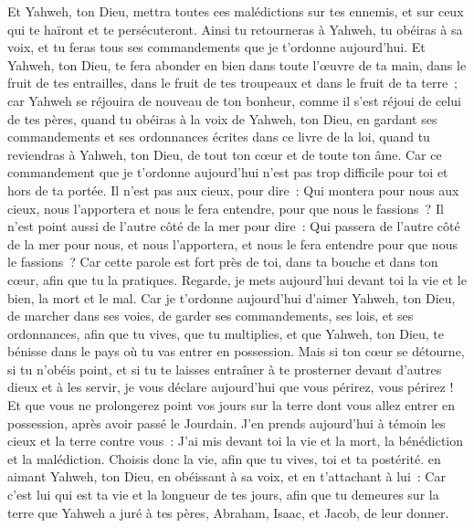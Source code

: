 \begin{multicols}{2}
Et Yahweh, ton Dieu, mettra toutes ces malédictions sur tes ennemis, et sur ceux qui te haïront et te persécuteront.
Ainsi tu retourneras à Yahweh, tu obéiras à sa voix, et tu feras tous ses commandements que je t'ordonne aujourd'hui.
Et Yahweh, ton Dieu, te fera abonder en bien dans toute l'œuvre de ta main, dans le fruit de tes entrailles, dans le fruit de tes troupeaux et dans le fruit de ta terre~; car Yahweh se réjouira de nouveau de ton bonheur, comme il s'est réjoui de celui de tes pères,
quand tu obéiras à la voix de Yahweh, ton Dieu, en gardant ses commandements et ses ordonnances écrites dans ce livre de la loi, quand tu reviendras à Yahweh, ton Dieu, de tout ton cœur et de toute ton âme.
Car ce commandement que je t'ordonne aujourd'hui n'est pas trop difficile pour toi et hors de ta portée.
Il n'est pas aux cieux, pour dire~: Qui montera pour nous aux cieux, nous l'apportera et nous le fera entendre, pour que nous le fassions~?
Il n'est point aussi de l'autre côté de la mer pour dire~: Qui passera de l'autre côté de la mer pour nous, et nous l'apportera, et nous le fera entendre pour que nous le fassions~?
Car cette parole est fort près de toi, dans ta bouche et dans ton cœur, afin que tu la pratiques.
Regarde, je mets aujourd'hui devant toi la vie et le bien, la mort et le mal.
Car je t'ordonne aujourd'hui d'aimer Yahweh, ton Dieu, de marcher dans ses voies, de garder ses commandements, ses lois, et ses ordonnances, afin que tu vives, que tu multiplies, et que Yahweh, ton Dieu, te bénisse dans le pays où tu vas entrer en possession.
Mais si ton cœur se détourne, si tu n'obéis point, et si tu te laisses entraîner à te prosterner devant d'autres dieux et à les servir,
je vous déclare aujourd'hui que vous périrez, vous périrez ! Et que vous ne prolongerez point vos jours sur la terre dont vous allez entrer en possession, après avoir passé le Jourdain.
J'en prends aujourd'hui à témoin les cieux et la terre contre vous~: J'ai mis devant toi la vie et la mort, la bénédiction et la malédiction. Choisis donc la vie, afin que tu vives, toi et ta postérité.
en aimant Yahweh, ton Dieu, en obéissant à sa voix, et en t'attachant à lui~: Car c'est lui qui est ta vie et la longueur de tes jours, afin que tu demeures sur la terre que Yahweh a juré à tes pères, Abraham, Isaac, et Jacob, de leur donner.

\end{multicols}
